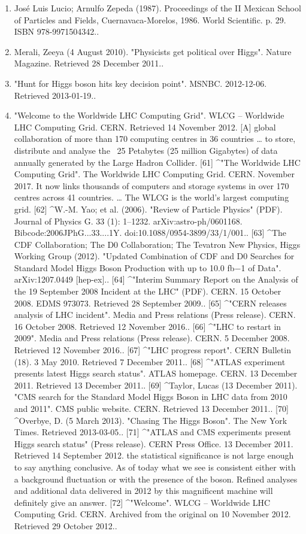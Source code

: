 \begin{enumerate}
    \item José Luis Lucio; Arnulfo Zepeda (1987). Proceedings of the II Mexican School of Particles and Fields, Cuernavaca-Morelos, 1986. World Scientific. p. 29. ISBN 978-9971504342..
    \item Merali, Zeeya (4 August 2010). "Physicists get political over Higgs". Nature Magazine. Retrieved 28 December 2011..
    \item "Hunt for Higgs boson hits key decision point". MSNBC. 2012-12-06. Retrieved 2013-01-19..
    \item "Welcome to the Worldwide LHC Computing Grid". WLCG – Worldwide LHC Computing Grid. CERN. Retrieved 14 November 2012. [A] global collaboration of more than 170 computing centres in 36 countries … to store, distribute and analyse the ~25 Petabytes (25 million Gigabytes) of data annually generated by the Large Hadron Collider.
[61]
^"The Worldwide LHC Computing Grid". The Worldwide LHC Computing Grid. CERN. November 2017. It now links thousands of computers and storage systems in over 170 centres across 41 countries. … The WLCG is the world's largest computing grid.
[62]
^W.-M. Yao; et al. (2006). "Review of Particle Physics" (PDF). Journal of Physics G. 33 (1): 1–1232. arXiv:astro-ph/0601168. Bibcode:2006JPhG...33....1Y. doi:10.1088/0954-3899/33/1/001..
[63]
^The CDF Collaboration; The D0 Collaboration; The Tevatron New Physics, Higgs Working Group (2012). "Updated Combination of CDF and D0 Searches for Standard Model Higgs Boson Production with up to 10.0 fb−1 of Data". arXiv:1207.0449 [hep-ex]..
[64]
^"Interim Summary Report on the Analysis of the 19 September 2008 Incident at the LHC" (PDF). CERN. 15 October 2008. EDMS 973073. Retrieved 28 September 2009..
[65]
^"CERN releases analysis of LHC incident". Media and Press relations (Press release). CERN. 16 October 2008. Retrieved 12 November 2016..
[66]
^"LHC to restart in 2009". Media and Press relations (Press release). CERN. 5 December 2008. Retrieved 12 November 2016..
[67]
^"LHC progress report". CERN Bulletin (18). 3 May 2010. Retrieved 7 December 2011..
[68]
^"ATLAS experiment presents latest Higgs search status". ATLAS homepage. CERN. 13 December 2011. Retrieved 13 December 2011..
[69]
^Taylor, Lucas (13 December 2011). "CMS search for the Standard Model Higgs Boson in LHC data from 2010 and 2011". CMS public website. CERN. Retrieved 13 December 2011..
[70]
^Overbye, D. (5 March 2013). "Chasing The Higgs Boson". The New York Times. Retrieved 2013-03-05..
[71]
^"ATLAS and CMS experiments present Higgs search status" (Press release). CERN Press Office. 13 December 2011. Retrieved 14 September 2012. the statistical significance is not large enough to say anything conclusive. As of today what we see is consistent either with a background fluctuation or with the presence of the boson. Refined analyses and additional data delivered in 2012 by this magnificent machine will definitely give an answer.
[72]
^"Welcome". WLCG – Worldwide LHC Computing Grid. CERN. Archived from the original on 10 November 2012. Retrieved 29 October 2012..
\end{enumerate}
